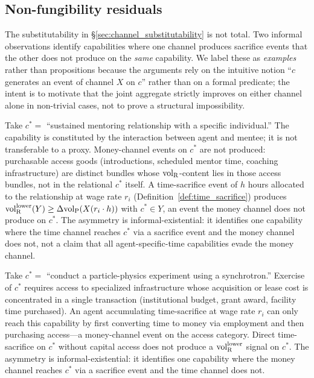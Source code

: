 \subsection{Non-fungibility residuals}

The substitutability in \S\ref{sec:channel_substitutability} is
not total.  Two informal observations identify capabilities
where one channel produces sacrifice events that the other
does not produce on the \emph{same} capability.  We label
these as \emph{examples} rather than propositions because the
arguments rely on the intuitive notion ``$c$ generates an
event of channel $X$ on $c$'' rather than on a formal
predicate; the intent is to motivate that the joint aggregate
strictly improves on either channel alone in non-trivial
cases, not to prove a structural impossibility.

\begin{example}
\label{ex:agent_specific_time}
Take $c^\ast = $ ``sustained mentoring relationship with a
specific individual.''  The capability is constituted by the
interaction between agent and mentee; it is not transferable
to a proxy.  Money-channel events on $c^\ast$ are not produced:
purchasable access goods (introductions, scheduled mentor time,
coaching infrastructure) are distinct bundles whose
${\operatorname{vol}_{\mathrm{R}}}$-content lies in those access bundles, not in the
relational $c^\ast$ itself.  A time-sacrifice event of $h$
hours allocated to the relationship at wage rate $r_i$
(Definition~\ref{def:time_sacrifice}) produces
${\operatorname{vol}_{\mathrm{R}}^{\mathrm{lower}}}(Y) \geq \Delta{\operatorname{vol}_{\mathrm{P}}}(X(r_i \cdot h))$ with $c^\ast
\in Y$, an event the money channel does not produce on
$c^\ast$.  The asymmetry is informal-existential: it identifies
one capability where the time channel reaches $c^\ast$ via a
sacrifice event and the money channel does not, not a claim
that all agent-specific-time capabilities evade the money
channel.
\end{example}

\begin{example}
\label{ex:capital_concentrated}
Take $c^\ast = $ ``conduct a particle-physics experiment using
a synchrotron.''  Exercise of $c^\ast$ requires access to
specialized infrastructure whose acquisition or lease cost is
concentrated in a single transaction (institutional budget,
grant award, facility time purchased).  An agent accumulating
time-sacrifice at wage rate $r_i$ can only reach this
capability by first converting time to money via employment and
then purchasing access---a money-channel event on the access
category.  Direct time-sacrifice on $c^\ast$ without capital
access does not produce a ${\operatorname{vol}_{\mathrm{R}}^{\mathrm{lower}}}$ signal on $c^\ast$.
The asymmetry is informal-existential: it identifies one
capability where the money channel reaches $c^\ast$ via a
sacrifice event and the time channel does not.
\end{example}

